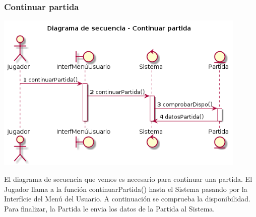 \subsubsection{Continuar partida}
\begin{center}
  \includegraphics[width=0.9\textwidth]{./imatges/jugador/Continuar_partida.png}
  \end{center}
  El diagrama de secuencia que vemos es necesario para continuar una partida. El Jugador llama a la función continuarPartida() hasta el Sistema pasando por la Interfície del Menú del Usuario. A continuación se comprueba la disponibilidad. Para finalizar, la Partida le envia los datos de la Partida al Sistema.
  
